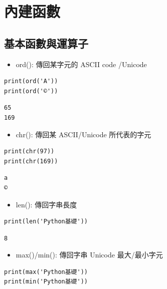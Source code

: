 \documentclass[a4paper,12pt]{article}
\begin{document}
\section{內建函數}
\label{py-build-in-functions}
\subsection{基本函數與運算子}
\label{sec:org8d4b664}
\begin{itemize}
\item ord(): 傳回某字元的 ASCII code /Unicode\\
\end{itemize}
\lstset{breaklines=true,language=Python,label= ,caption= ,captionpos=b,firstnumber=1,numbers=left}
\begin{lstlisting}
print(ord('A'))
print(ord('©'))
\end{lstlisting}
\begin{verbatim}
65
169
\end{verbatim}

\begin{itemize}
\item chr(): 傳回某 ASCII/Unicode 所代表的字元\\
\end{itemize}
\lstset{breaklines=true,language=Python,label= ,caption= ,captionpos=b,firstnumber=1,numbers=left}
\begin{lstlisting}
print(chr(97))
print(chr(169))
\end{lstlisting}
\begin{verbatim}
a
©
\end{verbatim}

\begin{itemize}
\item len(): 傳回字串長度\\
\end{itemize}
\lstset{breaklines=true,language=Python,label= ,caption= ,captionpos=b,firstnumber=1,numbers=left}
\begin{lstlisting}
print(len('Python基礎'))
\end{lstlisting}

\begin{verbatim}
8
\end{verbatim}


\begin{itemize}
\item max()/min(): 傳回字串 Unicode 最大/最小字元\\
\end{itemize}
\lstset{breaklines=true,language=Python,label= ,caption= ,captionpos=b,firstnumber=1,numbers=left}
\begin{lstlisting}
print(max('Python基礎'))
print(min('Python基礎'))
\end{lstlisting}
\end{document}
